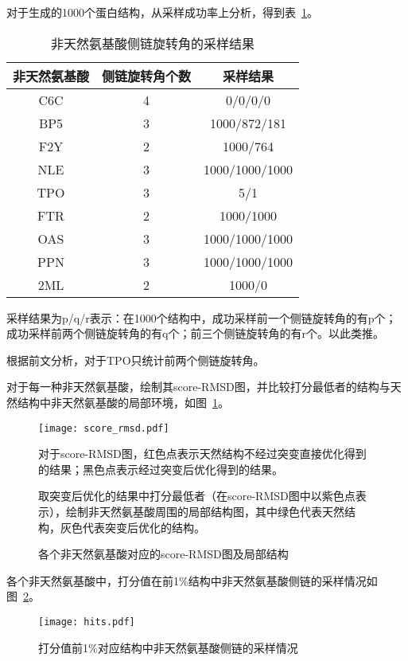 对于生成的1000个蛋白结构，从采样成功率上分析，得到表~\ref{tab:sample}。
\begin{table}
  \centering
  \begin{threeparttable}[c]
    \caption{非天然氨基酸侧链旋转角的采样结果}
    \label{tab:sample}
    \begin{tabular}{ccc}
      \toprule
      非天然氨基酸   & 侧链旋转角个数    &  采样结果\tnote{①} \\
      \midrule
      C6C           &  4               &    0/0/0/0         \\
      BP5           &  3               &    1000/872/181    \\
      F2Y           &  2               &    1000/764        \\
      NLE           &  3               &    1000/1000/1000  \\
      TPO\tnote{②}  &  3               &    5/1             \\
      FTR           &  2               &    1000/1000       \\
      OAS           &  3               &    1000/1000/1000  \\
      PPN           &  3               &    1000/1000/1000  \\
      2ML           &  2               &    1000/0          \\
      \bottomrule
    \end{tabular}
    \begin{tablenotes}
      \item [①] 采样结果为p/q/r表示：在1000个结构中，成功采样前一个侧链旋转角的有p个；成功采样前两个侧链旋转角的有q个；前三个侧链旋转角的有r个。以此类推。
      \item [②] 根据前文分析，对于TPO只统计前两个侧链旋转角。
    \end{tablenotes}
  \end{threeparttable}
\end{table}
对于每一种非天然氨基酸，绘制其score-RMSD图，并比较打分最低者的结构与天然结构中非天然氨基酸的局部环境，如图~\ref{fig:score_rmsd}。
\begin{figure}
  \centering
  \texttt{[image: score\_rmsd.pdf]}
  \caption{各个非天然氨基酸对应的score-RMSD图及局部结构}
  \label{fig:score_rmsd}
  \begin{threeparttable}
    \begin{tablenotes}
      \item [①] 对于score-RMSD图，红色点表示天然结构不经过突变直接优化得到的结果；黑色点表示经过突变后优化得到的结果。
      \item [②] 取突变后优化的结果中打分最低者（在score-RMSD图中以紫色点表示），绘制非天然氨基酸周围的局部结构图，其中绿色代表天然结构，灰色代表突变后优化的结构。
    \end{tablenotes}
  \end{threeparttable}
\end{figure}
各个非天然氨基酸中，打分值在前1\%结构中非天然氨基酸侧链的采样情况如图~\ref{fig:hits}。
\begin{figure}
  \centering
  \texttt{[image: hits.pdf]}
  \caption{打分值前1\%对应结构中非天然氨基酸侧链的采样情况}
  \label{fig:hits}
\end{figure}

